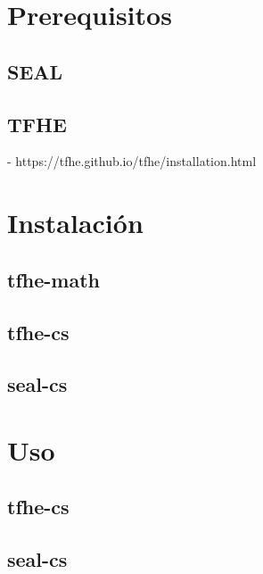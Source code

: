 
\section{Prerequisitos}

\subsection{SEAL}

\subsection{TFHE}

- https://tfhe.github.io/tfhe/installation.html

\section{Instalación}

\subsection{tfhe-math}


\subsection{tfhe-cs}


\subsection{seal-cs}


\section{Uso}


\subsection{tfhe-cs}



\subsection{seal-cs}
